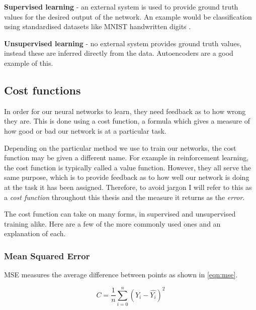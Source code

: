 \textbf{Supervised learning} - an external system is used to provide ground truth values for the desired output of the network. An example would be classification using standardised datasets like MNIST handwritten digits \cite{lecun1998mnist}.


\textbf{Unsupervised learning} - no external system provides ground truth values, instead these are inferred directly from the data. Autoencoders are a good example of this.  




\subsection{Cost functions}
In order for our neural networks to learn, they need feedback as to how wrong they are. This is done using a cost function, a formula which gives a measure of how good or bad our network is at a particular task.

Depending on the particular method we use to train our networks, the cost function may be given a different name. For example in reinforcement learning, the cost function is typically called a value function. However, they all serve the same purpose, which is to provide feedback as to how well our network is doing at the task it has been assigned. Therefore, to avoid jargon I will refer to this as a \textit{cost function} throughout this thesis and the measure it returns as the \textit{error}.

The cost function can take on many forms, in supervised and unsupervised training alike. Here are a few of the more commonly used ones and an explanation of each.

\subsubsection{Mean Squared Error}
\ac{MSE} measures the average difference between points as shown in \autoref{eqn:mse}.

\begin{equation} \label{eqn:mse}
C = \frac{1}{n}\sum_{i=0}^{n} (Y_i - \hat{Y_i})^2
\end{equation}

